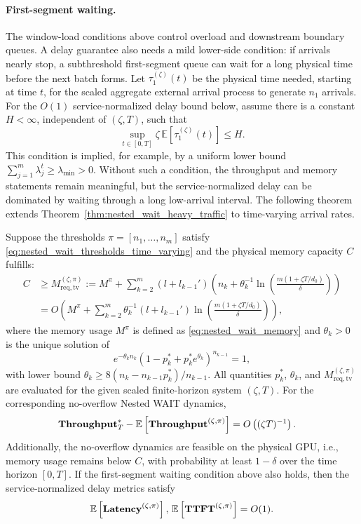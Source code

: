 \paragraph{First-segment waiting.}
The window-load conditions above control overload and downstream boundary queues. A delay guarantee also needs a mild lower-side condition: if arrivals nearly stop, a subthreshold first-segment queue can wait for a long physical time before the next batch forms. Let \(\tau_1^{(\zeta)}(t)\) be the physical time needed, starting at time \(t\), for the scaled aggregate external arrival process to generate \(n_1\) arrivals. For the \(O(1)\) service-normalized delay bound below, assume there is a constant \(H<\infty\), independent of \((\zeta,T)\), such that
\[
    \sup_{t\in[0,T]}\zeta\,\mathbb E[\tau_1^{(\zeta)}(t)]\le H .
\]
This condition is implied, for example, by a uniform lower bound \(\sum_{j=1}^m\lambda_j^t\ge\lambda_{\min}>0\). Without such a condition, the throughput and memory statements remain meaningful, but the service-normalized delay can be dominated by waiting through a long low-arrival interval.
The following theorem extends Theorem~\ref{thm:nested_wait_heavy_traffic} to time-varying arrival rates.

\begin{theorem}
\label{thm:nested_wait_heavy_traffic_time_varying}
Suppose the thresholds $\pi = [n_1, \dots, n_m]$ satisfy \eqref{eq:nested_wait_thresholds_time_varying} and the physical memory capacity \(C\) fulfills:
\[
\begin{aligned}
	C &\ge M_{\mathrm{req},\mathrm{tv}}^{(\zeta,\pi)}
	:= M^{\pi} + \sum_{k=2}^m (l + l_{k-1}') \left(n_k + \theta_k^{-1} \ln\!\left( \tfrac{m(1+\zeta T/d_0)}{\delta} \right)\right) \\
	    &= O\!\left( M^\pi + \sum_{k=2}^m \theta_k^{-1}  (l + l_{k-1}') \ln\!\left( \tfrac{m(1+\zeta T/d_0)}{\delta} \right) \right),
\end{aligned}
\]
where the memory usage $M^\pi$ is defined as \eqref{eq:nested_wait_memory} and \(\theta_k>0\) is the unique solution of
\[
    e^{-\theta_k n_k}(1-p_k^*+p_k^*e^{\theta_k})^{n_{k-1}}=1,
\]
with lower bound \(\theta_k\ge 8(n_k-n_{k-1}p_k^*)/n_{k-1}\).
All quantities \(p_k^*\), \(\theta_k\), and \(M_{\mathrm{req},\mathrm{tv}}^{(\zeta,\pi)}\) are evaluated for the given scaled finite-horizon system \((\zeta,T)\).
For the corresponding no-overflow Nested WAIT dynamics,
$$
    \begin{aligned}
        &\textbf{Throughput}_T^* - \mathbb{E}\left[ \textbf{Throughput}^{(\zeta, \pi)} \right]
   = O\left( (\zeta T)^{-1} \right).
    \end{aligned}
$$
Additionally, the no-overflow dynamics are feasible on the physical GPU, i.e., memory usage remains below \(C\), with probability at least $1 - \delta$ over the time horizon $[0,T].$
If the first-segment waiting condition above also holds, then the service-normalized delay metrics satisfy
\[
\mathbb{E}\left[ \textbf{Latency}^{(\zeta, \pi)} \right], \,\mathbb{E}\left[ \textbf{TTFT}^{(\zeta, \pi)} \right] = O(1).
\]
\end{theorem}

